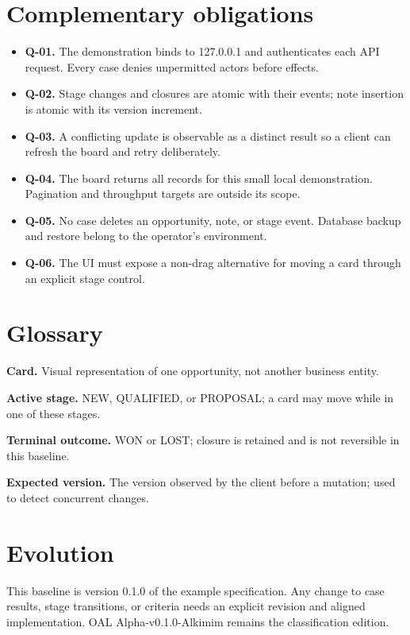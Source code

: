 \documentclass[10pt,a4paper]{article}
\begin{document}
\section{Complementary obligations}

\begin{itemize}

\item \textbf{Q-01.} The demonstration binds to 127.0.0.1 and authenticates each API request. Every case denies unpermitted actors before effects.

\item \textbf{Q-02.} Stage changes and closures are atomic with their events; note insertion is atomic with its version increment.

\item \textbf{Q-03.} A conflicting update is observable as a distinct result so a client can refresh the board and retry deliberately.

\item \textbf{Q-04.} The board returns all records for this small local demonstration. Pagination and throughput targets are outside its scope.

\item \textbf{Q-05.} No case deletes an opportunity, note, or stage event. Database backup and restore belong to the operator's environment.

\item \textbf{Q-06.} The UI must expose a non-drag alternative for moving a card through an explicit stage control.

\end{itemize}

\section{Glossary}

\textbf{Card.} Visual representation of one opportunity, not another business entity.

\textbf{Active stage.} NEW, QUALIFIED, or PROPOSAL; a card may move while in one of these stages.

\textbf{Terminal outcome.} WON or LOST; closure is retained and is not reversible in this baseline.

\textbf{Expected version.} The version observed by the client before a mutation; used to detect concurrent changes.

\section{Evolution}

This baseline is version 0.1.0 of the example specification. Any change to case results, stage transitions, or criteria needs an explicit revision and aligned implementation. OAL Alpha-v0.1.0-Alkimim remains the classification edition.
\end{document}
